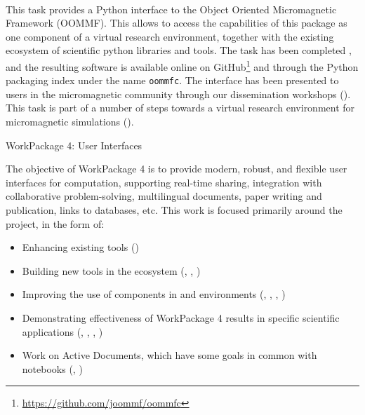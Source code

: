 \documentclass{deliverablereport}
\makeatletter
\renewcommand\subsubsection{\@startsection{subsubsection}{2}%
  \z@{.5\linespacing\@plus.7\linespacing}{.1\linespacing}%
  {\normalfont\bfseries}}
\makeatother
\begin{document}
  \paragraph{}
  \label{component-architecture@oommf-python-interface}
  This task provides a Python interface to the Object Oriented
  Micromagnetic Framework (OOMMF). This allows to access the
  capabilities of this package as one component of a virtual research
  environment, together with the existing ecosystem of scientific
  python libraries and tools. The task has been completed \cite{Beg2017a}, and the
  resulting software is available online on
  GitHub\footnote{\url{https://github.com/joommf/oommfc}} and through
  the Python packaging index under the name \texttt{oommfc}. The
  interface has been presented to users in the micromagnetic community
  through our dissemination workshops
  (). This
  task is part of a number of steps towards a virtual research
  environment for micromagnetic simulations
  ().

\clearpage
\subsubsection{WorkPackage 4: User Interfaces}

The objective of WorkPackage 4 is to provide modern, robust, and flexible user interfaces for
computation, supporting real-time sharing, integration with collaborative problem-solving,
multilingual documents, paper writing and publication, links to databases, etc. This work is focused primarily around the \Jupyter project, in the form of:

\begin{itemize}
    \item Enhancing existing \Jupyter tools ()
    \item Building new tools in the \Jupyter ecosystem (, , )
    \item Improving the use of \ODK components in \Jupyter and \Sage environments (, , , )
    \item Demonstrating effectiveness of WorkPackage 4 results in specific scientific applications (, , , )
    \item Work on Active Documents, which have some goals in common with \Jupyter notebooks (, )
\end{itemize}
\end{document}
